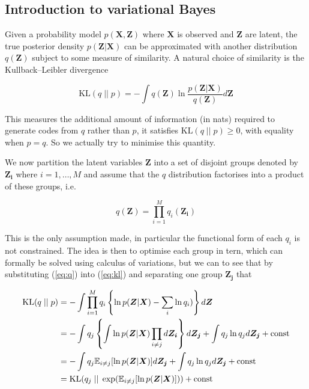 \documentclass{article}
\begin{document}
\subsection{Introduction to variational Bayes}

Given a probability model $p(\boldsymbol{X}, \boldsymbol{Z})$ where $\boldsymbol{X}$ is observed and $\boldsymbol{Z}$ are latent, the true posterior density $p(\boldsymbol{Z} | \boldsymbol{X})$ can be approximated with another distribution $q(\boldsymbol{Z})$ subject to some measure of similarity. A natural choice of similarity is the Kullback–Leibler divergence

\begin{equation}
\label{eq:kl}
   \text{KL} (q\; ||\; p) = -\int q(\boldsymbol{Z}) \ln \frac{p(\boldsymbol{Z} | \boldsymbol{X})}{q(\boldsymbol{Z})} d\boldsymbol{Z}
\end{equation}

This measures the additional amount of information (in nats) required to generate codes from $q$ rather than $p$, it satisfies $\text{KL}(q\; ||\; p) \ge 0$, with equality when $p = q$. So we actually try to minimise this quantity.

We now partition the latent variables $\boldsymbol{Z}$ into a set of disjoint groups denoted by $\boldsymbol{Z_i}$ where $i = 1, \dots, M$ and assume that the $q$ distribution factorises into a product of these groups, i.e.

\begin{equation}
\label{eq:q}
  q(\boldsymbol{Z}) = \prod_{i = 1}^M q_i(\boldsymbol{Z_i})
\end{equation}

This is the only assumption made, in particular the functional form of each $q_i$ is not constrained. The idea is then to optimise each group in tern, which can formally be solved using calculus of variations, but we can to see that by substituting (\ref{eq:q}) into (\ref{eq:kl}) and separating one group $\boldsymbol{Z_j}$ that

\begin{align}
    \text{KL}(q\; ||\; p) &= -\int \prod_{i = 1}^M q_i \left\{ \ln p(\boldsymbol{Z} | \boldsymbol{X}) - \sum_i \ln q_i) \right\} d \boldsymbol{Z}\notag \\
    &= -\int q_j \left\{ \int \ln p(\boldsymbol{Z} | \boldsymbol{X}) \prod_{i \ne j} d \boldsymbol{Z_i} \right\} d \boldsymbol{Z_j} + \int q_j \ln q_j d \boldsymbol{Z_j} + \text{const}\notag\\
    &= -\int q_j \mathbb{E}_{i \ne j}[\ln p(\boldsymbol{Z} | \boldsymbol{X})] d \boldsymbol{Z_j} + \int q_j \ln q_j d \boldsymbol{Z_j} + \text{const}\notag\\
    &= \text{KL}(q_j\; ||\; \exp (\mathbb{E}_{i \ne j}[\ln p(\boldsymbol{Z} | \boldsymbol{X})])) + \text{const}
\end{align}
\end{document}
